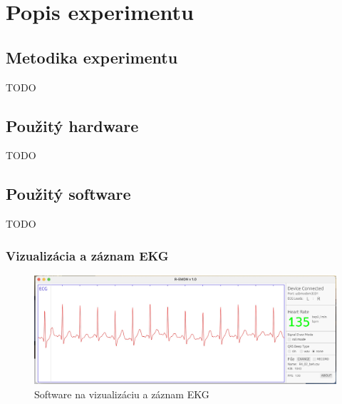 \chapter{Popis experimentu}

\section{Metodika experimentu}

TODO

\section{Použitý hardware}

TODO

\section{Použitý software}

TODO

\subsection{Vizualizácia a záznam EKG}

\begin{figure}[H]
    \centering
    \includegraphics[scale=0.18]{img/ok.jpeg}
    \caption{Software na vizualizáciu a záznam EKG}
    \label{fig:SW_ok}
\end{figure}

